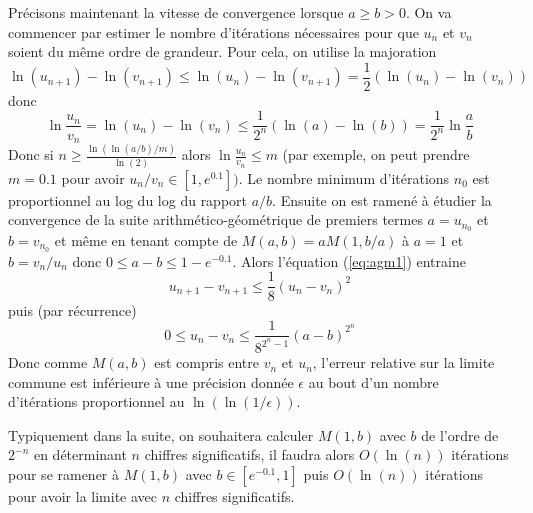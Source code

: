 \documentclass[a4paper,11pt]{article}
\begin{document}
\begin{giacjshere}
Précisons maintenant la vitesse de convergence lorsque $a \geq b>0$. 
On va commencer par estimer le nombre
d'itérations nécessaires pour que $u_n$ et $v_n$ soient du même ordre de grandeur.
Pour cela, on utilise la majoration
\[ \ln(u_{n+1})-\ln(v_{n+1}) \leq \ln(u_{n})-\ln(v_{n+1}) = \frac{1}{2}
(\ln(u_{n})-\ln(v_{n})) \]
donc
\[ \ln \frac{u_n}{v_n} = \ln(u_n)-\ln(v_n) \leq 
\frac{1}{2^n} (\ln(a)-\ln(b)) = \frac{1}{2^n} \ln \frac{a}{b} \]
Donc si $n \geq \frac{\ln( \ln(a/b)/m)}{\ln(2)}$ alors
$\ln \frac{u_n}{v_n} \leq m$ (par exemple, on peut prendre $m=0.1$ pour 
avoir $u_n/v_n \in [1,e^{0.1}])$. Le nombre minimum d'itérations $n_0$ est proportionnel
au log du log du rapport $a/b$.
Ensuite on est ramené à étudier la convergence de la suite arithmético-géométrique
de premiers termes $a=u_{n_0}$ et $b=v_{n_0}$ et même en tenant compte
de $M(a,b)=aM(1,b/a)$ à $a=1$ et $b=v_n/u_n$ donc $0\leq a-b \leq 1-e^{-0.1}$.
Alors l'équation (\ref{eq:agm1}) entraine 
\[ u_{n+1}-v_{n+1} \leq \frac{1}{8}(u_n-v_n)^2 \]
puis (par récurrence)
\[ 0 \leq u_n-v_n \leq \frac{1}{8^{2^n-1}}(a-b)^{2^n} \]
Donc comme $M(a,b)$ est compris entre $v_n$ et $u_n$, l'erreur relative sur la limite
commune est inférieure à une précision donnée $\epsilon$
au bout d'un nombre d'itérations proportionnel au $\ln(\ln(1/\epsilon))$.

Typiquement dans la suite, on souhaitera calculer $M(1,b)$ avec $b$ de l'ordre
de $2^{-n}$ en déterminant $n$ chiffres significatifs,
il faudra alors $O(\ln(n))$ itérations pour se ramener à $M(1,b)$ avec $b\in [e^{-0.1},1]$ 
puis $O(\ln(n))$ itérations pour avoir la limite avec $n$ chiffres significatifs.


\end{giacjshere}
\end{document}
